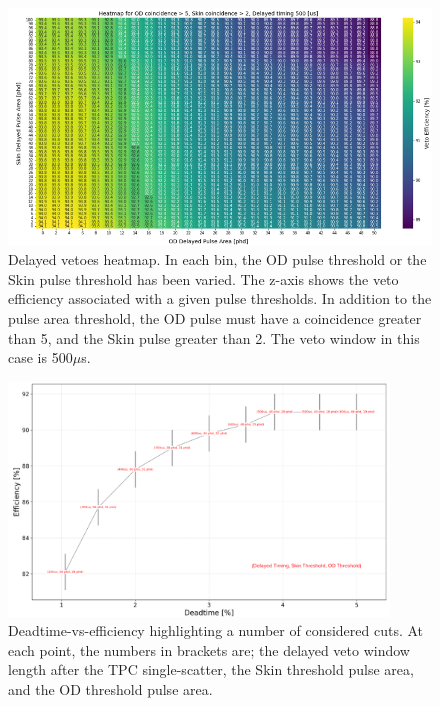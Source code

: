 \begin{figure}
    \centering
    \includegraphics[width=\textwidth]{figures/VetoEfficiency/HeatMap_ODPA_SkinPA_eff.png}
    \caption{Delayed vetoes heatmap.
    In each bin, the OD pulse threshold or the Skin pulse threshold has been varied.
    The z-axis shows the veto efficiency associated with a given pulse thresholds.
    In addition to the pulse area threshold, the OD pulse must have a coincidence greater than 5, and the Skin pulse greater than 2.
    The veto window in this case is 500$\mu$s.}
    \label{fig:skin_delayed_veto_heatmap}
\end{figure}

\begin{figure}
    \centering
    \includegraphics[width=0.9\textwidth]{figures/VetoEfficiency/cut_optimisation.png}
    \caption{Deadtime-vs-efficiency highlighting a number of considered cuts.
    At each point, the numbers in brackets are; the delayed veto window length after the TPC single-scatter, the Skin threshold pulse area, and the OD threshold pulse area.}
    \label{fig:veto_cut_optimisation}
\end{figure}

